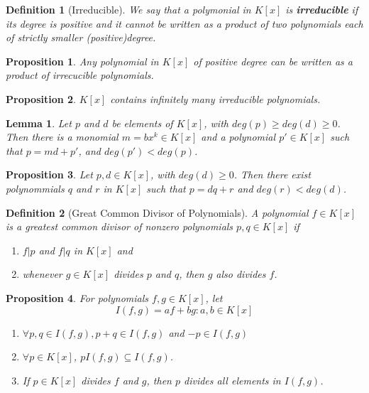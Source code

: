 \documentclass[12pt]{article}
\newtheorem{definition}{Definition}[subsection]
\newtheorem{proposition}{Proposition}[subsection]
\newtheorem{lemma}{Lemma}[subsection]
\begin{document}
    \begin{definition}[Irreducible]
        We say that a polymonial in $K[x]$ is \textbf{irreducible} if its degree is positive and it cannot be written as a product of two polynomials each of strictly smaller (positive)degree.
    \end{definition}
    \begin{proposition}
        Any polynomial in $K[x]$ of positive degree can be written as a product of irrecucible polynomials.
    \end{proposition}
    \begin{proposition}
        $K[x]$ contains infinitely many irreducible polynomials.
    \end{proposition}
    \begin{lemma}
        Let $p$ and $d$ be elements of $K[x]$, with $deg(p) \geq deg(d) \geq 0$. Then there is a monomial $m = bx^k \in K[x]$ and a polynomial $p' \in K[x]$ such that $p = md + p'$, and $deg(p') < deg(p)$.
    \end{lemma}

    \begin{proposition}
        Let $p, d \in K[x]$, with $deg(d) \geq 0$. Then there exist polynommials $q$ and $r$ in $K[x]$ such that $p = dq+r$ and $deg(r) < deg(d)$.
    \end{proposition}
    \begin{definition}[Great Common Divisor of Polynomials]
        A polynomial $f\in K[x]$ is a greatest common divisor of nonzero polynomials $p,q \in K[x]$ if
        \begin{enumerate}
            \item $f|p$ and $f|q$ in $K[x]$ and
            \item whenever $g \in K[x]$ divides $p$ and $q$, then $g$ also divides $f$.
        \end{enumerate}

    \end{definition}

    \begin{proposition}
        For polynomials $f,g \in K[x]$, let
        \begin{equation}
            I(f,g) = {af+bg:a,b \in K[x]}
        \end{equation}
        \begin{enumerate}
            \item $\forall p,q \in I(f,g), p+q\in I(f,g)$ and $-p\in I(f,g)$
            \item $\forall p \in K[x]$, $pI(f,g) \subseteq I(f,g)$.
            \item If $p \in K[x]$ divides $f$ and $g$, then $p$ divides all elements in $I(f,g)$.
        \end{enumerate}

    \end{proposition}
    
\end{document}

